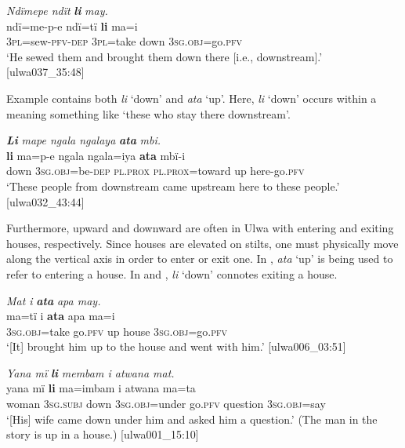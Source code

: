 \ea%
    \label{ex:otherwc:77}
          \textit{Ndïmepe ndït} \textbf{\textit{li}} \textit{may.}\\
\gll    ndï=me-p-e    ndï=tï    \textbf{li}    ma=i\\
    3\textsc{pl}=sew-\textsc{pfv-dep}  \textsc{3pl}=take  down  3\textsc{sg.obj}=go.\textsc{pfv}\\
\glt `He sewed them and brought them down there [i.e., downstream].’ [ulwa037\_35:48]
\z

Example  contains both \textit{li} ‘down’ and \textit{ata} ‘up’. Here, \textit{li} ‘down’ occurs within a  meaning something like ‘these who stay there downstream’.

\ea%
    \label{ex:otherwc:78}
          \textbf{\textit{Li}} \textit{mape ngala ngalaya} \textbf{\textit{ata}} \textit{mbi.}\\
\gll    \textbf{li}    ma=p-e      ngala    ngala=iya      \textbf{ata} mbï-i\\
    down  3\textsc{sg.obj}=be\textsc{{}-dep}  \textsc{pl.prox}  \textsc{pl.prox=}toward  up    here-go.\textsc{pfv}\\
\glt `These people from downstream came upstream here to these people.’ [ulwa032\_43:44]
\z

Furthermore, upward  and downward  are often  in Ulwa with entering and exiting houses, respectively. Since houses are elevated on stilts, one must physically move along the vertical axis in order to enter or exit one. In , \textit{ata} ‘up’ is being used to refer to entering a house. In  and , \textit{li} ‘down’ connotes exiting a house.

\ea%
    \label{ex:otherwc:79}
          \textit{Mat i} \textbf{\textit{ata}} \textit{apa may.}\\
\gll    ma=tï      i    \textbf{ata}  apa    ma=i\\
    3\textsc{sg.obj}=take  go.\textsc{pfv}  up  house  3\textsc{sg.obj}=go.\textsc{pfv}\\
\glt `[It] brought him up to the house and went with him.’ [ulwa006\_03:51]
\z

\ea%
    \label{ex:otherwc:80}
          \textit{Yana mï} \textbf{\textit{li}} \textit{membam i atwana mat.}\\
\gll    yana  mï      \textbf{li}    ma=imbam    i    atwana ma=ta\\
    woman  3\textsc{sg.subj}  down  3\textsc{sg.obj}=under  go.\textsc{pfv}  question    3\textsc{sg.obj}=say\\
\glt `[His] wife came down under him and asked him a question.’ (The man in the story is up in a house.) [ulwa001\_15:10]
\z

